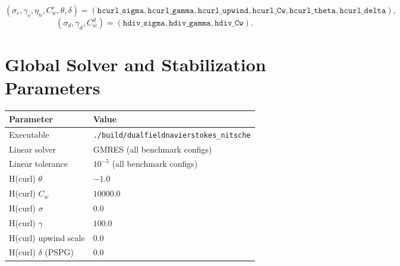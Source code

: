 \documentclass[11pt]{article}
\begin{document}
\[
	(\sigma_c,\gamma_c,\eta_u,C_w^c,\theta,\delta)
	=(\texttt{hcurl\_sigma},\texttt{hcurl\_gamma},\texttt{hcurl\_upwind},\texttt{hcurl\_Cw},\texttt{hcurl\_theta},\texttt{hcurl\_delta}),
\]
\[
	(\sigma_d,\gamma_d,C_w^d)
	=(\texttt{hdiv\_sigma},\texttt{hdiv\_gamma},\texttt{hdiv\_Cw}).
\]

\section*{Global Solver and Stabilization Parameters}

\begin{table}[H]
	\centering
	\begin{tabularx}{\textwidth}{@{}lX@{}}
		\toprule
		Parameter               & Value                                                                                                                              \\
		\midrule
		Executable              & \texttt{./build/dualfieldnavierstokes\_nitsche}                                                                                    \\
		Linear solver           & GMRES (all benchmark configs)                                                                                                      \\
		Linear tolerance        & $10^{-5}$ (all benchmark configs)                                                                                                  \\
		H(curl) $\theta$        & $-1.0$                                                                                                                             \\
		H(curl) $C_w$           & $10000.0$                                                                                                                          \\
		H(curl) $\sigma$        & $0.0$                                                                                                                              \\
		H(curl) $\gamma$        & $100.0$                                                                                                                            \\
		H(curl) upwind scale    & $0.0$                                                                                                                              \\
		H(curl) $\delta$ (PSPG) & $0.0$                                                                                                                              \\

\end{tabularx}
\end{table}
\end{document}
